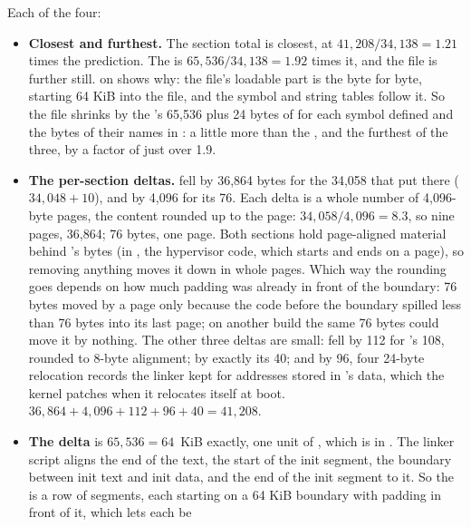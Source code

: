  Each of the four:
\begin{itemize}
  \item \textbf{Closest and furthest.} The section total is closest, at $41{,}208 / 34{,}138 =
    1.21$ times the prediction. The  is $65{,}536 / 34{,}138 = 1.92$ times it, and the
     file is further still.  on  shows why:
    the file's loadable part is the  byte for byte, starting 64 KiB into the file, and
    the symbol and string tables follow it. So the file shrinks by the 's 65,536 plus 24
    bytes of  for each symbol  defined and the bytes of their names in
    : a little more than the , and the furthest of the three, by a factor
    of just over 1.9.
  \item \textbf{The per-section deltas.}  fell by 36,864 bytes for the 34,058 that
     put there ($34{,}048 + 10$), and  by 4,096 for its 76. Each delta
    is a whole number of 4,096-byte pages, the content rounded up to the page: $34{,}058 / 4{,}096
    = 8.3$, so nine pages, 36,864; 76 bytes, one page. Both sections hold page-aligned material
    behind 's bytes (in , the hypervisor code, which starts and ends on
    a page), so removing anything moves it down in whole pages. Which way the rounding goes depends
    on how much padding was already in front of the boundary: 76 bytes moved  by a page
    only because the code before the boundary spilled less than 76 bytes into its last page; on
    another build the same 76 bytes could move it by nothing. The other three deltas are small:
     fell by 112 for 's 108, rounded to 8-byte alignment;
     by exactly its 40; and  by 96, four 24-byte relocation records
    the linker kept for addresses stored in 's data, which the kernel patches when
    it relocates itself at boot. $36{,}864 + 4{,}096 + 112 + 96 + 40 = 41{,}208$.
  \item \textbf{The  delta} is $65{,}536 = 64$~KiB exactly, one unit of
    , which is  in . The
    linker script aligns the end of the text, the start of the init segment, the boundary between
    init text and init data, and the end of the init segment to it. So the  is a row of
    segments, each starting on a 64 KiB boundary with padding in front of it, which lets each be

\end{itemize}

